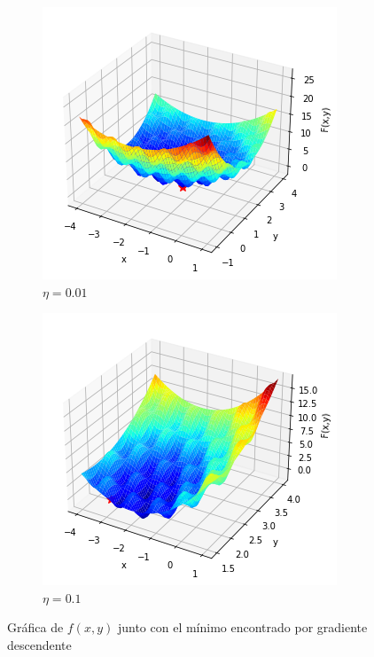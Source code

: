 \documentclass[10pt,a4paper]{article}
\begin{document}
\begin{figure}[h]
	\begin{subfigure}{0.5\textwidth}
		\centering
		\includegraphics[width=\textwidth]{ej1.3_grafica_eta0.01}
		\caption{$\eta = 0.01$}
	\end{subfigure}
	\begin{subfigure}{0.5\textwidth}
		\centering
		\includegraphics[width=\textwidth]{ej1.3_grafica_eta0.1}
		\caption{$\eta = 0.1$}
	\end{subfigure}
	\caption{Gráfica de $f(x,y)$ junto con el mínimo encontrado por gradiente descendente}
	\label{fig:ej1.3_graficas}
\end{figure}
\end{document}
